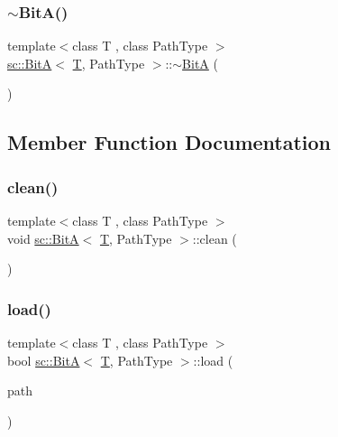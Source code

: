 \mbox{\label{classsc_1_1_bit_a_af7f26417ea7ed2f803ad5b3c41bded7a}} 
\subsubsection{\texorpdfstring{$\sim$BitA()}{~BitA()}}
{\footnotesize\ttfamily template$<$class T , class Path\+Type $>$ \\
\mbox{\hyperlink{classsc_1_1_bit_a}{sc\+::\+BitA}}$<$ \mbox{\hyperlink{_keyboard_event_8h_adf1f3edb9115acb0a1e04209b7a9937b}{T}}, Path\+Type $>$\+::$\sim$\mbox{\hyperlink{classsc_1_1_bit_a}{BitA}} (\begin{DoxyParamCaption}{ }\end{DoxyParamCaption})}



\subsection{Member Function Documentation}
\mbox{\label{classsc_1_1_bit_a_aba89b38422bfd070976920c78152a8e6}} 
\subsubsection{\texorpdfstring{clean()}{clean()}}
{\footnotesize\ttfamily template$<$class T , class Path\+Type $>$ \\
void \mbox{\hyperlink{classsc_1_1_bit_a}{sc\+::\+BitA}}$<$ \mbox{\hyperlink{_keyboard_event_8h_adf1f3edb9115acb0a1e04209b7a9937b}{T}}, Path\+Type $>$\+::clean (\begin{DoxyParamCaption}{ }\end{DoxyParamCaption})\hspace{0.3cm}{\ttfamily [private]}}

\mbox{\label{classsc_1_1_bit_a_af262a95d7f00879e2759f9ef564d9cd9}} 
\subsubsection{\texorpdfstring{load()}{load()}}
{\footnotesize\ttfamily template$<$class T , class Path\+Type $>$ \\
bool \mbox{\hyperlink{classsc_1_1_bit_a}{sc\+::\+BitA}}$<$ \mbox{\hyperlink{_keyboard_event_8h_adf1f3edb9115acb0a1e04209b7a9937b}{T}}, Path\+Type $>$\+::load (\begin{DoxyParamCaption}\item[{Path\+Type}]{path }\end{DoxyParamCaption})}



